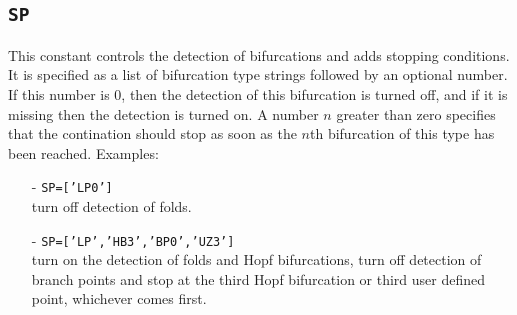 \documentclass[12pt]{report}
\begin{document}
\subsection{\texttt{SP}}  \label{sec:SP}
This constant controls the detection of bifurcations and adds stopping
conditions. It is specified as a list of bifurcation type strings
followed by an optional number. If this number is 0, then the detection
of this bifurcation is turned off, and if it is missing
then the detection is turned on. A number $n$ greater than zero
specifies that the contination should stop as soon as the $n$th
bifurcation of this type has been reached.
Examples:\\
\begin{itemize}
\item[-] {\tt SP=['LP0']}\\
turn off detection of folds.
\item[-] {\tt SP=['LP','HB3','BP0','UZ3']}\\
turn on the detection of folds and Hopf bifurcations,
turn off detection of branch points and stop at the third Hopf
bifurcation or third user defined point, whichever comes first.
\end{itemize}
 
\end{document}
